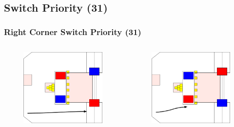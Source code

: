 \documentclass{beamer}
\begin{document}
\subsection{Switch Priority (31)}

\begin{frame}
 \frametitle{Right Corner Switch Priority \alert{(31)}}
 \begin{columns}
  \begin{figure}
   \includegraphics[scale=0.15]{assets/paths/31_LR}
  \end{figure}
  \begin{figure}
   \includegraphics[scale=0.15]{assets/paths/31_RL}

\end{figure}
\end{columns}
\end{frame}
\end{document}
